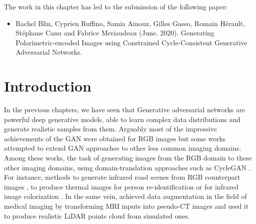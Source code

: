 The work in this chapter has led to the submission of the following paper: 
\begin{itemize}
	\item Rachel Blin, Cyprien Ruffino, Samia Ainouz,  Gilles Gasso, Romain H\'erault, St\'ephane Canu and Fabrice Meriaudeau (June. 2020). Generating Polarimetric-encoded Images using Constrained Cycle-Consistent Generative Adversarial Networks.
\end{itemize}

\setcounter{minitocdepth}{3}
\minitoc
\setcounter{minitocdepth}{2}

\section{Introduction}


In the previous chapters, we have seen that Generative  adversarial networks \citep{Goodfellow2014} are powerful deep generative models, able to learn complex data distributions and generate realistic samples from them. Arguably most of the impressive achievements of the \ac{GAN} were obtained for \ac{RGB} images but some works attempted to extend \ac{GAN} approaches to other less common imaging domains. Among these works, the task of generating images from the \ac{RGB} domain to these other imaging domains, using domain-translation approaches such as \ac{CycleGAN} \citep{Zhu2017a}. For instance, methods to generate infrared road scenes from \ac{RGB} counterpart images \citep{Zhang2018b}, to produce thermal images for person re-identification \citep{Kniaz2018} or for infrared image colorization \citep{Mehri2019}. In the same vein, \citet{Nie2017} achieved data augmentation in the field of medical imaging by transforming MRI inputs into pseudo-CT images and \citet{Sallab2019} used it to produce realistic \ac{LiDAR} points cloud from simulated ones. 

